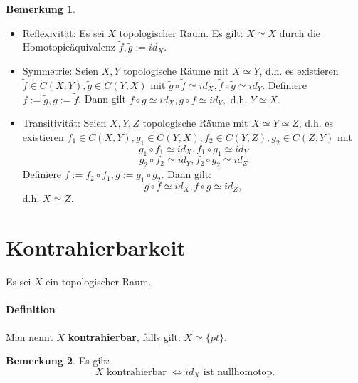 \documentclass[a4paper,11pt,notitlepage]{report}
\theoremstyle{definition}
\newtheorem{remark}{Bemerkung}[chapter]
\begin{document}
\begin{remark}
	$ $
	\begin{itemize}
		\item Reflexivität: Es sei $X$ topologischer Raum.
			Es gilt: $X \simeq X$ durch die Homotopieäquivalenz $\tilde{f},\tilde{g} := id_X$.
		\item Symmetrie: Seien $X,Y$ topologische Räume mit $X \simeq Y$, d.h. es existieren $\tilde{f} \in C(X,Y), \tilde{g} \in C(Y,X)$ mit $\tilde{g} \circ \tilde{f} \simeq id_X, \tilde{f} \circ \tilde{g} \simeq id_Y$.
		Definiere $f:= \tilde{g}, g:= \tilde{f}$.
		Dann gilt $f \circ g \simeq id_X, g \circ f \simeq id_Y,\text{ d.h. }Y \simeq X.$
		
		\item Transitivität: Seien $X,Y,Z$ topologische Räume mit $X \simeq Y \simeq Z$, d.h. es existieren $f_1 \in C(X,Y), g_1 \in C(Y,X), f_2 \in C(Y,Z), g_2 \in C(Z,Y)$ mit
		$$g_1 \circ f_1 \simeq id_X, f_1 \circ g_1 \simeq id_Y$$
		$$g_2 \circ f_2 \simeq id_Y, f_2 \circ g_2 \simeq id_Z$$
		Definiere $f := f_2 \circ f_1, g:= g_1 \circ g_2$. Dann gilt:
		$$g \circ f \simeq id_X, f \circ g \simeq id_Z,$$
		d.h. $X \simeq Z$.
	\end{itemize}
\end{remark}

\section{Kontrahierbarkeit}
Es sei $X$ ein topologischer Raum.

\paragraph{Definition} Man nennt $X$ \textbf{kontrahierbar}, falls gilt: $X \simeq \{pt\}$.

\begin{remark}
	Es gilt:
	$$X \text{ kontrahierbar } \Leftrightarrow id_X \text{ ist nullhomotop.}$$
\end{remark}
\end{document}
